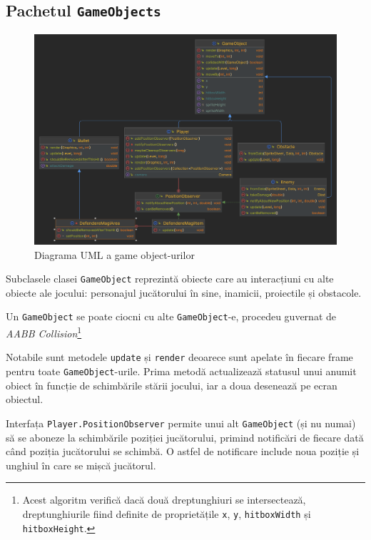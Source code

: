 \documentclass{article}
\begin{document}
    \subsection{Pachetul \texttt{GameObjects}}
    \begin{figure}[H]
        \includegraphics[width=\linewidth]{gameobjects-diagram}
        \centering
        \caption{Diagrama UML a game object-urilor}
    \end{figure}

    Subclasele clasei \texttt{GameObject} reprezintă obiecte care au interacțiuni cu alte obiecte
    ale jocului: personajul jucătorului în sine, inamicii, proiectile și obstacole.

    Un \texttt{GameObject} se poate ciocni cu alte \texttt{GameObject}-e, procedeu guvernat de
    \emph{AABB Collision}\footnote{Acest algoritm verifică dacă două dreptunghiuri se intersectează,
    dreptunghiurile fiind definite de proprietățile \texttt{x}, \texttt{y}, \texttt{hitboxWidth} și
    \texttt{hitboxHeight}.}

    Notabile sunt metodele \texttt{update} și \texttt{render} deoarece sunt apelate în fiecare frame
    pentru toate \texttt{GameObject}-urile. Prima metodă actualizează statusul unui anumit obiect în
    funcție de schimbările stării jocului, iar a doua desenează pe ecran obiectul.

    Interfața \texttt{Player.PositionObserver} permite unui alt \texttt{GameObject} (și nu numai) să
    se aboneze la schimbările poziției jucătorului, primind notificări de fiecare dată când poziția
    jucătorului se schimbă. O astfel de notificare include noua poziție și unghiul în care se mișcă
    jucătorul.
\end{document}
